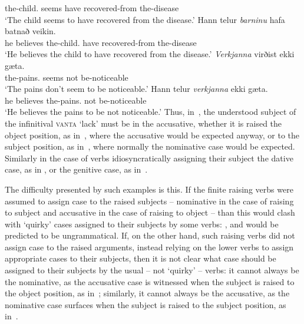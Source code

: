 \documentclass[output=paper]{langsci/langscibook}
\begin{document}
      the-child.\DAT{} seems have\INF{} recovered-from the-disease\\
\glt `The child seems to have recovered from the disease.'
\ex
\gll   Hann telur \textit{barninu} hafa batnað veikin. \\
      he believes the-child.\DAT{} have\INF{} recovered-from the-disease\\
\glt    `He believes the child to have recovered from the disease.'
\zl
\eal
\label{isl:gen}
\ex
\gll   \textit{Verkjanna} virðist ekki g\ae{}ta. \\
      the-pains.\GEN{} seems not be-noticeable\INF{}\\
\glt    `The pains don't seem to be noticeable.'
\ex
\gll Hann telur \textit{verkjanna} ekki g\ae{}ta. \\
     he believes the-pains.\GEN{} not be-noticeable\INF{}\\
\glt `He believes the pains to be not noticeable.'
\zl
Thus, in~, the understood subject of the infinitival \textsc{vanta} `lack’ must be in the accusative, whether it is raised the object position, as in~, where the accusative would be expected anyway, or to the subject position, as in~, where normally the nominative case would be expected.  Similarly in the case of verbs idiosyncratically assigning their subject the dative case, as in , or the genitive case, as in~.

The difficulty presented by such examples is this. If the finite raising verbs were assumed to assign case to the raised subjects – nominative in the case of raising to subject and accusative in the case of raising to object – than this would clash with `quirky’ cases assigned to their subjects by some verbs: ,  and  would be predicted to be ungrammatical.  If, on the other hand, such raising verbs did not assign case to the raised arguments, instead relying on the lower verbs to assign appropriate cases to their subjects, then it is not clear what case should be assigned to their subjects by the usual – not `quirky’ – verbs: it cannot always be the nominative, as the accusative case is witnessed when the subject is raised to the object position, as in~; similarly, it cannot always be the accusative, as the nominative case surfaces when the subject is raised to the subject position, as in~.
\end{document}
